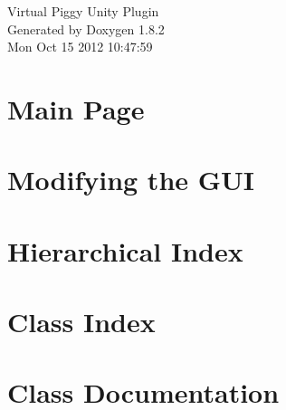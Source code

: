 \documentclass{book}
\begin{document}
\hypersetup{pageanchor=false,citecolor=blue}
\begin{titlepage}
\vspace*{7cm}
\begin{center}
{\Large Virtual Piggy Unity Plugin }\\
\vspace*{1cm}
{\large Generated by Doxygen 1.8.2}\\
\vspace*{0.5cm}
{\small Mon Oct 15 2012 10:47:59}\\
\end{center}
\end{titlepage}
\clearemptydoublepage
{}
\tableofcontents
\clearemptydoublepage
{}
\hypersetup{pageanchor=true,citecolor=blue}
\chapter{Main Page}
\label{index}\hypertarget{index}{}
\chapter{Modifying the G\-U\-I}
\label{modifying_the_gui}
\hypertarget{modifying_the_gui}{}

\chapter{Hierarchical Index}

\chapter{Class Index}

\chapter{Class Documentation}








\printindex
\end{document}
